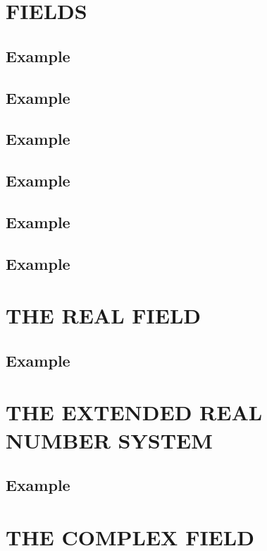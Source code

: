 \section{FIELDS}

\subsection*{\textbf{Example}}
\label{sec:12}


\subsection*{\textbf{Example}}
\label{sec:14}
\subsection*{\textbf{Example}}
\label{sec:15}
\subsection*{\textbf{Example}}
\label{sec:16}
\subsection*{\textbf{Example}}
\label{sec:17}
\subsection*{\textbf{Example}}
\label{sec:18}


\section{THE REAL FIELD}

\subsection*{\textbf{Example}}
\label{sec:19}
\label{sec:22}


\section*{THE EXTENDED REAL NUMBER SYSTEM}
\subsection*{\textbf{Example}}
\label{sec:23}



\section{THE COMPLEX FIELD}

